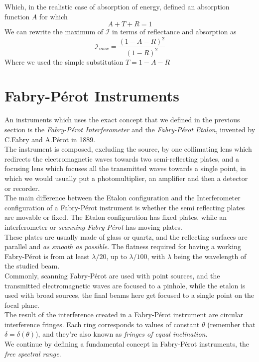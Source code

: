 \documentclass[../electromagnetism.tex]{subfiles}
\begin{document}
Which, in the realistic case of absorption of energy, defined an absorption function $A$ for which
\begin{equation*}
	A+T+R=1
\end{equation*}
We can rewrite the maximum of $\mathcal{I}$ in terms of reflectance and absorption as
\begin{equation*}
	\mathcal{I}_{max}=\frac{(1-A-R)^2}{(1-R)^2}
\end{equation*}
Where we used the simple substitution $T=1-A-R$
\section{Fabry-Pérot Instruments}
An instruments which uses the exact concept that we defined in the previous section is the \emph{Fabry-Pérot Interferometer} and the \emph{Fabry-Pérot Etalon}, invented by C.Fabry and A.Pérot in 1889.\\
The instrument is composed, excluding the source, by one collimating lens which redirects the electromagnetic waves towards two semi-reflecting plates, and a focusing lens which focuses all the transmitted waves towards a single point, in which we would usually put a photomultiplier, an amplifier and then a detector or recorder.\\
The main difference between the Etalon configuration and the Interferometer configuration of a Fabry-Pérot instrument is whether the semi reflecting plates are movable or fixed. The Etalon configuration has fixed plates, while an interferometer or \textit{scanning Fabry-Pérot} has moving plates.\\
These plates are usually made of glass or quartz, and the reflecting surfaces are parallel and \textit{as smooth as possible}. The flatness required for having a working Fabry-Pérot is from at least $\lambda/20$, up to $\lambda/100$, with $\lambda$ being the wavelength of the studied beam.\\
Commonly, scanning Fabry-Pérot are used with point sources, and the transmitted electromagnetic waves are focused to a pinhole, while the etalon is used with broad sources, the final beams here get focused to a single point on the focal plane.\\
The result of the interference created in a Fabry-Pérot instrument are circular interference fringes. Each ring corresponds to values of constant $\theta$ (remember that $\delta=\delta(\theta)$), and they're also known as \textit{fringes of equal inclination}.\\
We continue by defining a fundamental concept in Fabry-Pérot instruments, the \textit{free spectral range}.
\end{document}
